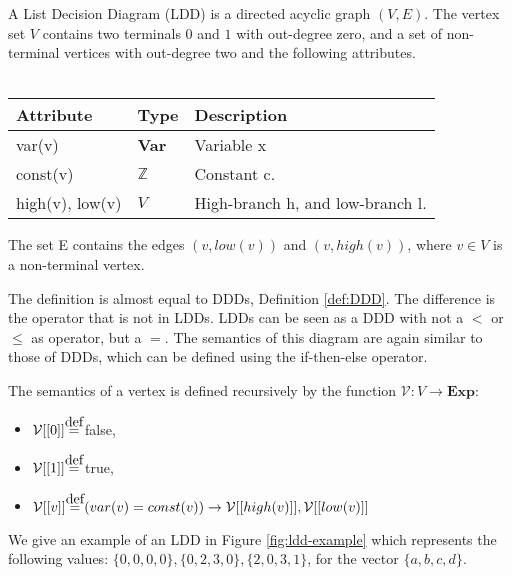 \begin{mydef}
\label{def:LDD}
A List Decision Diagram (LDD) is a directed acyclic graph $(V,E)$. The vertex set $V$ contains two terminals $0$ and $1$ with out-degree zero, and a set of non-terminal vertices with out-degree two and the following attributes.
\\\\
\begin{tabular}{lll}
Attribute                & Type                      & Description                                           \\\hline
var(v)                   & \textbf{Var}              & Variable x \\

const(v)                 & $\mathbb{Z}$              & Constant c.                                           \\
high(v), low(v)          & $V$                       & High-branch h, and low-branch l.                   
\end{tabular}
The set E contains the edges $(v,low(v))$ and $(v, high(v))$, where $v \in V$ is a non-terminal vertex.
\end{mydef} 

The definition is almost equal to DDDs, Definition \ref{def:DDD}. The difference is the operator that is not in LDDs. LDDs can be seen as a DDD with not a $<$ or $\leq$ as operator, but a $=$. The semantics of this diagram are again similar to those of DDDs, which can be defined using the if-then-else operator. 



\begin{mydef}
\label{def:LDDSemantics}
The semantics of a vertex is defined recursively by the function $\mathcal{V}: V \rightarrow \textbf{Exp}:$
\begin{itemize}
\item $\mathcal{V}[[0]] \myeq$ false,
\item $\mathcal{V}[[1]] \myeq$ true,
\item \begin{math} \mathcal{V}[[v]] \myeq
(var(v) = const(v)) \rightarrow \mathcal{V}[[high(v)]],\mathcal{V}[[low(v)]]\\
\end{math}
\end{itemize}
\end{mydef}

We give an example of an LDD in Figure \ref{fig:ldd-example} which represents the following values: $\{0,0,0,0\}, \{0,2,3,0\}, \{2,0,3,1\}$, for the vector $\{a,b,c,d\}$.

